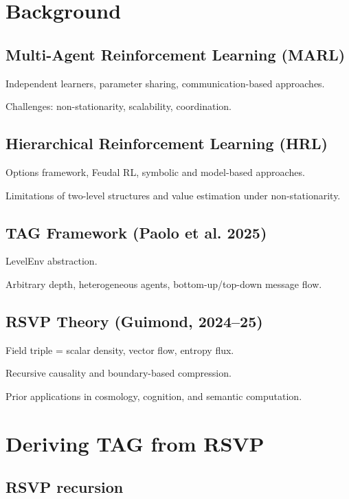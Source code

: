 \documentclass[11pt,a4paper]{article}
\begin{document}
\section{Background}

\subsection{Multi-Agent Reinforcement Learning (MARL)}

Independent learners, parameter sharing, communication-based approaches.

Challenges: non-stationarity, scalability, coordination.

\subsection{Hierarchical Reinforcement Learning (HRL)}

Options framework, Feudal RL, symbolic and model-based approaches.

Limitations of two-level structures and value estimation under non-stationarity.

\subsection{TAG Framework (Paolo et al. 2025)}

LevelEnv abstraction.

Arbitrary depth, heterogeneous agents, bottom-up/top-down message flow.

\subsection{RSVP Theory (Guimond, 2024–25)}

Field triple  = scalar density, vector flow, entropy flux.

Recursive causality and boundary-based compression.

Prior applications in cosmology, cognition, and semantic computation.

\section{Deriving TAG from RSVP}

\subsection{RSVP recursion}
\end{document}
